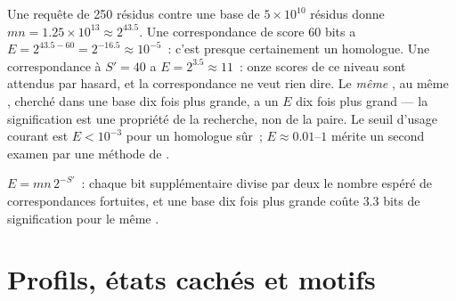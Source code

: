 \begin{example}\label{ex:b3:bioinformatics:evalue}
Une requête de \num{250} résidus contre une base de $5\times 10^{10}$
résidus donne $mn = 1.25\times 10^{13} \approx 2^{43.5}$. Une
correspondance de score $60$ bits a
$E = 2^{43.5 - 60} = 2^{-16.5} \approx 10^{-5}$~: c'est presque
certainement un homologue. Une
correspondance à $S' = 40$ a $E = 2^{3.5}
\approx 11$~: onze scores de ce niveau sont attendus par hasard, et la
correspondance ne veut rien dire. Le \emph{même} , au même
, cherché dans une base dix fois plus grande, a un $E$ dix
fois plus grand --- la signification est une propriété de la recherche,
non de la paire. Le seuil d'usage courant est $E < 10^{-3}$ pour un
homologue sûr~; $E \approx 0.01$--$1$ mérite un second examen par une
méthode de .
\end{example}

\begin{omfigure}

{\small $E = mn\,2^{-S'}$~: chaque bit supplémentaire divise par deux
le nombre espéré de correspondances fortuites, et une base dix fois
plus grande coûte $3.3$ bits de signification pour le même .}
\end{omfigure}

\section{Profils, états cachés et motifs}

